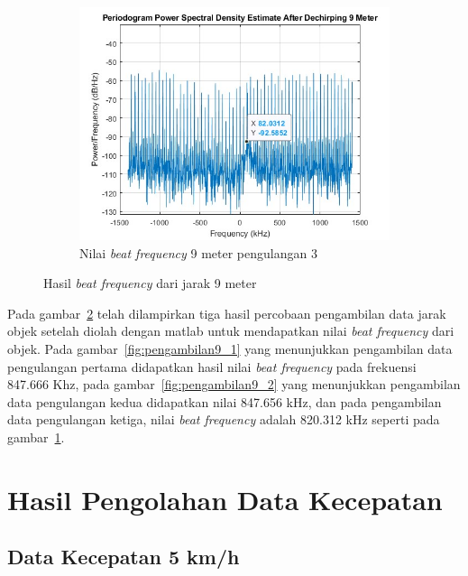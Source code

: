 \begin{figure}
\begin{subfigure}[b]{0.6\textwidth}
        \centering
		\includegraphics[scale=0.35]{pics/bab5/Range/3_9.jpg}
		\caption{Nilai \textit{beat frequency} 9 meter pengulangan 3}
		\label{fig:pengambilan9_3}
    \end{subfigure}
    \caption{Hasil \textit{beat frequency} dari jarak 9 meter}
    \label{fig:pengambilan9}
\end{figure}

Pada gambar~\ref{fig:pengambilan9} telah dilampirkan tiga hasil percobaan pengambilan data jarak objek setelah diolah dengan matlab untuk mendapatkan nilai \textit{beat frequency} dari objek. Pada gambar~\ref{fig:pengambilan9_1} yang menunjukkan pengambilan data pengulangan pertama didapatkan hasil nilai \textit{beat frequency} pada frekuensi 847.666 Khz, pada gambar~\ref{fig:pengambilan9_2} yang menunjukkan pengambilan data pengulangan kedua didapatkan nilai 847.656 kHz, dan pada pengambilan data pengulangan ketiga, nilai \textit{beat frequency} adalah 820.312 kHz seperti pada gambar~\ref{fig:pengambilan9_3}.

\section{Hasil Pengolahan Data Kecepatan}

\subsection{Data Kecepatan 5 km/h}

